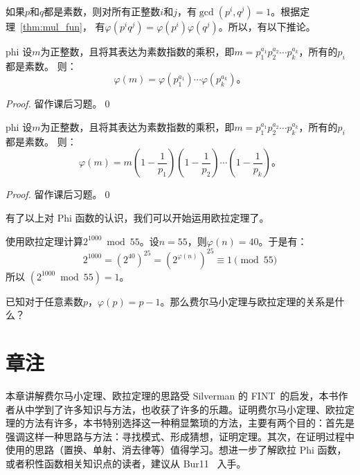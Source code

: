 如果$p$和$q$都是素数，则对所有正整数$i$和$j$，有$\gcd(p^i, q^j) = 1$。根据定理~\ref{thm:mul_fun}，
有$\varphi( p^i q^j) = \varphi(p^i) \varphi(q^j) $。所以，有以下推论。

\begin{corollary}{}{phi}
设$m$为正整数，且将其表达为素数指数的乘积，即$m = p_1^{a_1} p_2^{a_2}\cdots p_k^{a_k}$，所有的$p_i$都是素数。
则：
	\[\varphi(m) = \varphi(p_1^{a_1})\cdots \varphi(p_k^{a_k})\text{。}\]
\end{corollary}

\begin{proof}
留作课后习题。\qed
\end{proof}

\begin{theorem}{}{phi}
设$m$为正整数，且将其表达为素数指数的乘积，即$m = p_1^{a_1} p_2^{a_2}\cdots p_k^{a_k}$，所有的$p_i$都是素数。
则：
	\[\varphi(m) = m (1 - \frac{1}{p_1}) (1 - \frac{1}{p_2}) \cdots (1 - \frac{1}{p_k})\text{。}\]
\end{theorem}

\begin{proof}
留作课后习题。\qed
\end{proof}

有了以上对 Phi 函数的认识，我们可以开始运用欧拉定理了。
\begin{example}
\label{exm:comp_euler_theorem}
	使用欧拉定理计算$2^{1000} \bmod 55$。设$n=55$，则$\varphi(n)=40$。于是有：
	\[2^{1000} = (2^{40})^{25} = (2^{\varphi(n)})^{25} \equiv 1 \pmod{55}\]
	所以 $(2^{1000} \bmod 55) = 1$。
\end{example}

\begin{thinking}
	已知对于任意素数$p$，$\varphi(p) = p - 1$。那么费尔马小定理与欧拉定理的关系是什么？
\end{thinking}
\section*{章注}
本章讲解费尔马小定理、欧拉定理的思路受 Silverman 的 FINT~\cite{silverman2014friendly}的启发，本书作者从中学到了许多知识与方法，也收获了许多的乐趣。证明费尔马小定理、欧拉定理的方法有许多，本书特别选择这一种稍显繁琐的方法，主要有两个目的：首先是强调这样一种思路与方法：寻找模式、形成猜想，证明定理。其次，在证明过程中使用的思路（置换、单射、消去律等）值得学习。想进一步了解欧拉 Phi 函数，或者积性函数相关知识点的读者，建议从 Bur11~\cite{Bur11} 入手。

